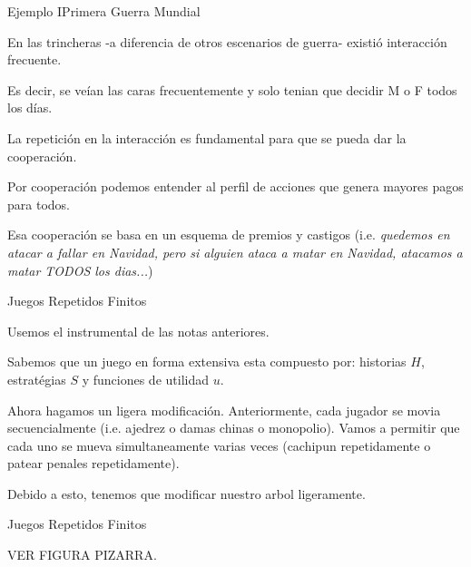 \documentclass[notes, 11pt]{beamer} %
\newenvironment{wideitemize}{\itemize\addtolength{\itemsep}{10pt}}{\enditemize}
\begin{document}
\begin{frame}{Ejemplo I}{Primera Guerra Mundial}
	\begin{wideitemize}
		\item<1-> En las trincheras -a diferencia de otros escenarios de guerra- existi\'o interacci\'on frecuente.
		\item<2-> Es decir, se ve\'ian las caras frecuentemente y solo tenian que decidir M o F todos los d\'ias.
		\item<3-> La repetici\'on en la interacci\'on es fundamental para que se pueda dar la cooperaci\'on.
		\begin{wideitemize}
			\item<4->[--] Por cooperaci\'on podemos entender al perfil de acciones que genera mayores pagos para todos. 
			\item<5->[--] Esa cooperaci\'on se basa en un esquema de premios y castigos (i.e. \textit{quedemos en atacar a fallar en Navidad, pero si alguien ataca a matar en Navidad, atacamos a matar TODOS los dias...})
		\end{wideitemize}
	\end{wideitemize}
\end{frame}

\begin{frame}{Juegos Repetidos Finitos}
	\begin{wideitemize}
		\item<1-> Usemos el instrumental de las notas anteriores.
		\item<2-> Sabemos que un juego en forma extensiva esta compuesto por: historias $H$, estrat\'egias $S$ y funciones de utilidad $u$.
		\item<3-> Ahora hagamos un ligera modificaci\'on. Anteriormente, cada jugador se movia secuencialmente (i.e. ajedrez o damas chinas o monopolio). Vamos a permitir que cada uno se mueva simultaneamente varias veces (cachipun repetidamente o patear penales repetidamente).
		\item<4-> Debido a esto, tenemos que modificar nuestro arbol ligeramente.
	\end{wideitemize}
\end{frame}

\begin{frame}{Juegos Repetidos Finitos}
	\begin{wideitemize}
		\item<1-> VER FIGURA PIZARRA.
	\end{wideitemize}
\end{frame}
\end{document}
